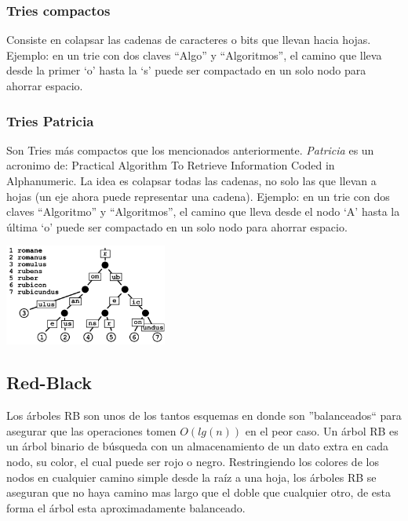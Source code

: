 \subsubsection{Tries compactos}
Consiste en colapsar las cadenas de caracteres o bits que llevan hacia hojas.
Ejemplo: en un trie con dos claves ``Algo'' y ``Algoritmos'', el camino que lleva desde la primer `o' hasta la `s' puede ser compactado en un solo nodo para ahorrar espacio.
\subsubsection{Tries Patricia}
Son Tries m\'as compactos que los mencionados anteriormente. \textit{Patricia} es un acronimo de: Practical Algorithm To Retrieve Information Coded in Alphanumeric.
La idea es colapsar todas las cadenas, no solo las que llevan a hojas (un eje ahora puede representar una cadena). 
Ejemplo: en un trie con dos claves ``Algoritmo'' y ``Algoritmos'', el camino que lleva desde el nodo `A' hasta la \'ultima `o' puede ser compactado en un solo nodo para ahorrar espacio.

\begin{center}
 \includegraphics[width=0.4\textwidth, height=0.3\textwidth]{./graficos/trie-patricia.png}
\end{center}

\subsection{Red-Black}

Los \'arboles RB son unos de los tantos esquemas en donde son ''balanceados`` para asegurar que las operaciones tomen $O(lg(n))$ en el peor caso. Un \'arbol RB es un \'arbol binario de b\'usqueda con un almacenamiento de un dato extra en cada nodo, su color, el cual puede ser rojo o negro. Restringiendo los colores de los nodos en cualquier camino simple desde la ra\'iz a una hoja, los \'arboles RB se aseguran que no haya camino mas largo que el doble que cualquier otro, de esta forma el \'arbol esta aproximadamente balanceado.

